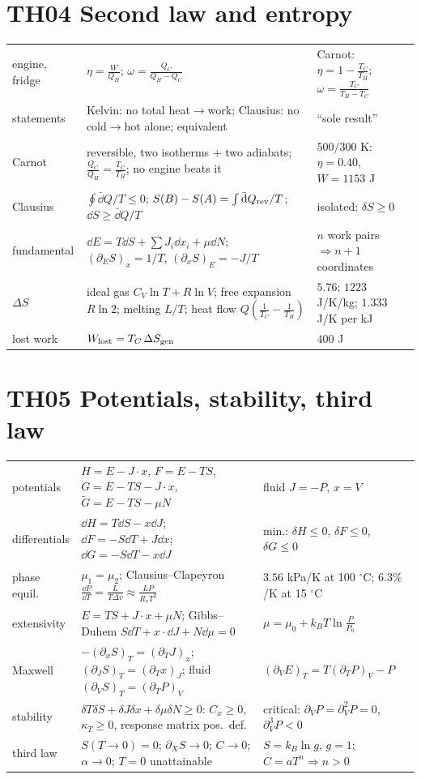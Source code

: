 \documentclass[9pt]{article}
\begin{document}
\section*{TH04 Second law and entropy}
\begin{tabular}{@{}p{2.9cm}p{8.4cm}p{6.1cm}@{}}
\toprule
engine, fridge & $\eta=\tfrac W{Q_H}$; $\omega=\tfrac{Q_C}{Q_H-Q_C}$ & Carnot: $\eta=1-\tfrac{T_C}{T_H}$; $\omega=\tfrac{T_C}{T_H-T_C}$\\
statements & Kelvin: no total heat$\to$work; Clausius: no cold$\to$hot alone; equivalent & ``sole result''\\
Carnot & reversible, two isotherms + two adiabats; $\tfrac{Q_C}{Q_H}=\tfrac{T_C}{T_H}$; no engine beats it & $500/300$ K: $\eta=0.40$, $W=1153$ J\\
Clausius & $\oint\bar{\dd}Q/T\le0$; $S(B)-S(A)=\int\bar{\mathrm{d}}Q_{\rm rev}/T$; $\dd S\ge\bar{\dd}Q/T$ & isolated: $\delta S\ge0$\\
fundamental & $\dd E=T\dd S+\sum J_i\dd x_i+\mu\dd N$; $(\partial_ES)_x=1/T$, $(\partial_{x}S)_E=-J/T$ & $n$ work pairs $\Rightarrow n+1$ coordinates\\
$\Delta S$ & ideal gas $C_V\ln T+R\ln V$; free expansion $R\ln2$; melting $L/T$; heat flow $Q(\tfrac1{T_C}-\tfrac1{T_H})$ & $5.76$; $1223$ J/K/kg; $1.333$ J/K per kJ\\
lost work & $W_{\rm lost}=T_C\,\Delta S_{\rm gen}$ & $400$ J\\
\bottomrule
\end{tabular}

\section*{TH05 Potentials, stability, third law}
\begin{tabular}{@{}p{2.9cm}p{8.4cm}p{6.1cm}@{}}
\toprule
potentials & $H=E-J\!\cdot\!x$, $F=E-TS$, $G=E-TS-J\!\cdot\!x$, $\tilde G=E-TS-\mu N$ & fluid $J=-P$, $x=V$\\
differentials & $\dd H=T\dd S-x\dd J$; $\dd F=-S\dd T+J\dd x$; $\dd G=-S\dd T-x\dd J$ & min.: $\delta H\le0$, $\delta F\le0$, $\delta G\le0$\\
phase equil. & $\mu_1=\mu_2$; Clausius--Clapeyron $\tfrac{\dd P}{\dd T}=\tfrac L{T\Delta v}\approx\tfrac{LP}{R_vT^2}$ & $3.56$ kPa/K at 100 $^\circ$C; $6.3\%$/K at 15 $^\circ$C\\
extensivity & $E=TS+J\!\cdot\!x+\mu N$; Gibbs--Duhem $S\dd T+x\!\cdot\!\dd J+N\dd\mu=0$ & $\mu=\mu_0+k_BT\ln\tfrac P{P_0}$\\
Maxwell & $-(\partial_xS)_T=(\partial_TJ)_x$; $(\partial_JS)_T=(\partial_Tx)_J$; fluid $(\partial_VS)_T=(\partial_TP)_V$ & $(\partial_VE)_T=T(\partial_TP)_V-P$\\
stability & $\delta T\delta S+\delta J\delta x+\delta\mu\delta N\ge0$: $C_x\ge0$, $\kappa_T\ge0$, response matrix pos.\ def. & critical: $\partial_VP=\partial_V^2P=0$, $\partial_V^3P<0$\\
third law & $S(T\to0)=0$; $\partial_XS\to0$; $C\to0$; $\alpha\to0$; $T=0$ unattainable & $S=k_B\ln g$, $g=1$; $C=aT^n\Rightarrow n>0$\\
\bottomrule
\end{tabular}
\end{document}
